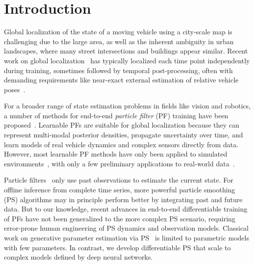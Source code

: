 \section{Introduction}
\vspace*{-5pt}
    Global localization of the state of a moving vehicle using a city-scale map is challenging due to the large area, as well as the inherent ambiguity in urban landscapes, where many street intersections and buildings appear similar. Recent work on global localization~\cite{shi2020where, Hu_2018_CVPR, noe2020eccv, zhu2021vigor, NEURIPS2019_ba2f0015, shi2019optimal, xia2022visual, 9635972GausePF, shi2020beyond, sarlin21pixloc, sarlin2023orienternet} has typically localized each time point independently during training, sometimes followed by temporal post-processing, often with demanding requirements like near-exact external estimation of relative vehicle poses~\cite{sarlin2023orienternet}. %
    
    For a broader range of state estimation problems in fields like vision and robotics, a number of methods for end-to-end \emph{particle filter} (PF) training have been proposed~\cite{9635972GausePF, pmlr-v139-corenflos21a_optimal_transport, pmlr-v87-karkus18a_soft_resampling, younis2023mdpf, jonschkowski18_differentiable_particle_filter, scibior2021differentiable}.  Learnable PFs are suitable for global localization because they can represent multi-modal posterior densities, propagate uncertainty over time, and learn models of real vehicle dynamics and complex sensors directly from data. However, most learnable PF methods have only been applied to simulated environments~\cite{pmlr-v139-corenflos21a_optimal_transport, pmlr-v87-karkus18a_soft_resampling, younis2023mdpf}, with only a few preliminary applications to real-world data~\cite{9635972GausePF, jonschkowski18_differentiable_particle_filter}.

    Particle filters~\cite{gordon1993novel,kanazawa95,doucet01,arulampalam02,probabilistic_robotics} only use past observations to estimate the current state.  For offline inference from complete time series, more powerful particle smoothing (PS) algorithms \cite{bresler1986TwoFilter,doi:10.1080/10618600.1996.10474692stratified, doucet2009tutorial, Klaas2006FastPS, briers2010smoothing, rauch1965maximum} may in principle perform better by integrating past and future data.  But to our knowledge, recent advances in end-to-end differentiable training of PFs have not been generalized to the more complex PS scenario, requiring error-prone human engineering of PS dynamics and observation models. Classical work on generative parameter estimation via PS~\cite{kantas2015particle} is limited to parametric models with few parameters. In contrast, we develop differentiable PS that scale to complex models defined by deep neural networks.
    
